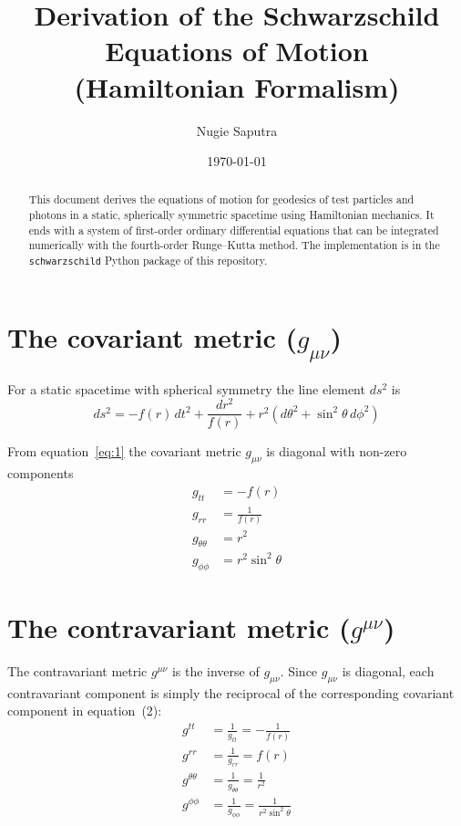 \documentclass[11pt,a4paper]{article}
\title{Derivation of the Schwarzschild Equations of Motion\\(Hamiltonian Formalism)}
\author{Nugie Saputra}
\date{\today}
\begin{document}
\maketitle

\begin{abstract}
This document derives the equations of motion for geodesics of test particles and photons in a static, spherically symmetric spacetime using Hamiltonian mechanics. It ends with a system of first-order ordinary differential equations that can be integrated numerically with the fourth-order Runge--Kutta method. The implementation is in the \texttt{schwarzschild} Python package of this repository.
\end{abstract}

\tableofcontents

\section{The covariant metric \texorpdfstring{($g_{\mu\nu}$)}{(g\_mu nu)}}
\label{sec:metric}

For a static spacetime with spherical symmetry the line element $ds^2$ is
\begin{equation*}
ds^2 = -f(r)\,dt^2 + \frac{dr^2}{f(r)} + r^2 \left( d\theta^2 + \sin^2\theta\,d\phi^2 \right) \tag{1}\label{eq:1}
\end{equation*}

From equation~\eqref{eq:1} the covariant metric $g_{\mu\nu}$ is diagonal with non-zero components
\begin{align*}
    g_{tt} &= -f(r) \tag{2a}\label{eq:2a} \\
    g_{rr} &= \frac{1}{f(r)} \tag{2b} \\
    g_{\theta\theta} &= r^2 \tag{2c} \\
    g_{\phi\phi} &= r^2 \sin^2\theta \tag{2d}
\end{align*}

\section{The contravariant metric \texorpdfstring{($g^{\mu\nu}$)}{(g\^{}mu nu)}}

The contravariant metric $g^{\mu\nu}$ is the inverse of $g_{\mu\nu}$. Since $g_{\mu\nu}$ is diagonal, each contravariant component is simply the reciprocal of the corresponding covariant component in equation~(2):
\begin{align*}
    g^{tt} &= \frac{1}{g_{tt}} = -\frac{1}{f(r)} \tag{3a}\label{eq:3a} \\
    g^{rr} &= \frac{1}{g_{rr}} = f(r) \tag{3b} \\
    g^{\theta\theta} &= \frac{1}{g_{\theta\theta}} = \frac{1}{r^2} \tag{3c} \\
    g^{\phi\phi} &= \frac{1}{g_{\phi\phi}} = \frac{1}{r^2 \sin^2\theta} \tag{3d}
\end{align*}
\end{document}
